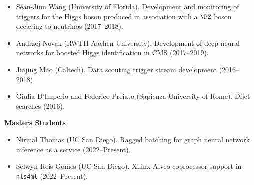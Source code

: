 \documentclass[11pt]{res}
\begin{document}
\begin{resume}
\begin{itemize}
    \item Sean-Jiun Wang (University of Florida). Development and monitoring of triggers for the Higgs boson produced in association with a $\PZ$ boson decaying to neutrinos ({2017--2018}).
    \item Andrzej Novak (RWTH Aachen University). Development of deep neural networks for boosted Higgs identification in CMS ({2017--2019}).
    \item Jiajing Mao (Caltech). Data scouting trigger stream development ({2016--2018}).
    \item Giulia D'Imperio and Federico Preiato (Sapienza University of Rome). Dijet searches ({2016}).
  \end{itemize}

  \textbf{Masters Students}
  \begin{itemize}
    \itemsep-0.3em
    \item Nirmal Thomas (UC San Diego). Ragged batching for graph neural network inference as a service ({2022--Present}).
    \item Selwyn Reis Gomes (UC San Diego). Xilinx Alveo coprocessor support in \texttt{hls4ml} ({2022--Present}).
  \end{itemize}


\end{resume}
\end{document}
